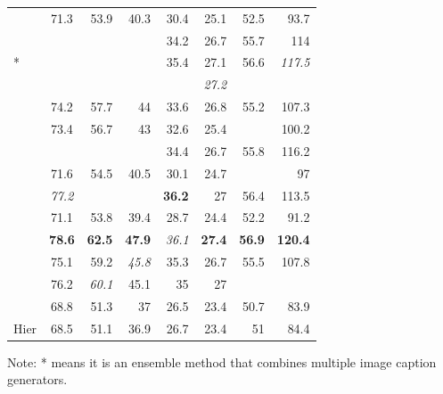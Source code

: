 \begin{longtable}[ht]{lcrrrrrr}
    \citet{Ren2017}	&	71.3	&	53.9	&	40.3	&	30.4	&	25.1	&	52.5	&	93.7	\\
    \citet{Rennie2017} 	&		&		&		&	34.2	&	26.7	&	55.7	&	114	\\
    \citet{Rennie2017}*	&		&		&		&	35.4	&	27.1	&	56.6	&	\textit{117.5}	\\
    \citet{Shetty2017}	&		&		&		&		&	\textit{27.2}	&		&		\\
    \citet{Wang2017}	&	74.2	&	57.7	&	44	&	33.6	&	26.8	&	55.2	&	107.3	\\
    \citet{Yao2017_Attr}	&	73.4	&	56.7	&	43	&	32.6	&	25.4	&		&	100.2	\\
    \citet{Zhang2017}	&		&		&		&	34.4	&	26.7	&	55.8	&	116.2	\\
    \citet{Zhou2017}	&	71.6	&	54.5	&	40.5	&	30.1	&	24.7	&		&	97	\\
    \citet{Anderson2018_BUTD}	&	\textit{77.2}	&		&		&	\textbf{36.2}	&	27	&	56.4	&	113.5	\\
    \citet{Aneja2018}	&	71.1	&	53.8	&	39.4	&	28.7	&	24.4	&	52.2	&	91.2	\\
    \citet{Gu2018}	&	\textbf{78.6}	&	\textbf{62.5}	&	\textbf{47.9}	&	\textit{36.1}	&	\textbf{27.4}	&\textbf{56.9}	&	\textbf{120.4}	\\
    \citet{Jiang2018}	&	75.1	&	59.2	&	\textit{45.8}	&	35.3	&	26.7	&	55.5	&	107.8	\\
    \citet{Khademi2018}	&	76.2	&	\textit{60.1}	&	45.1	&	35	&	27	&		&		\\
    \citet{Wang2018}	&	68.8	&	51.3	&	37	&	26.5	&	23.4	&	50.7	&	83.9	\\
    \citet{Wang2018} Hier	&	68.5	&	51.1	&	36.9	&	26.7	&	23.4	&	51	&	84.4	\\
    \bottomrule
\end{longtable}
\label{tab:benchmarks_mscoco}
\endgroup

Note: * means it is an ensemble method that combines multiple image caption generators.